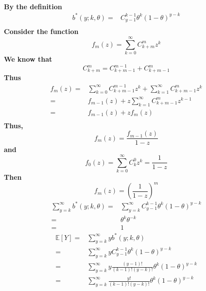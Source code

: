 \documentclass{article}
\begin{document}
    \paragraph{
        By the definition
        \begin{equation*}
            \begin{split}
                b^*(y;k,\theta)=&C_{y-1}^{k-1}\theta^k(1-\theta)^{y-k}\\
            \end{split}
        \end{equation*}
        Consider the function 
        $$f_m(z)=\sum_{k=0}^\infty C_{k+m}^m z^k$$
        We know that 
        $$C_{k+m}^m=C_{k+m-1}^{m-1}+C_{k+m-1}^m$$
        Thus
        \begin{equation*}
            \begin{split}
                f_m(z)=&\sum_{k=0}^\infty C_{k+m-1}^{m-1} z^k+\sum_{k=1}^\infty C_{k+m-1}^m z^k\\
                    =&f_{m-1}(z)+z\sum_{k=1}^\infty C_{k+m-1}^m z^{k-1}\\
                    =&f_{m-1}(z)+zf_m(z)\\
            \end{split}
        \end{equation*}
        Thus,
        $$f_m(z)=\frac{f_{m-1}(z)}{1-z}$$
        and 
        $$f_0(z)=\sum_{k=0}^\infty C_k^0z^k=\frac{1}{1-z}$$
        Then 
        $$f_m(z)=(\frac{1}{1-z})^m$$
        \begin{equation*}
            \begin{split}
                \sum_{y=k}^\infty b^*(y;k,\theta)=&\sum_{y=k}^\infty C_{y-1}^{k-1}\theta^k(1-\theta)^{y-k}\\
                    =&\theta^k\theta^{-k}\\
                    =&1
            \end{split}
        \end{equation*}
        \begin{equation*}
            \begin{split}
                \mathbb{E}[Y]=&\sum_{y=k}^\infty yb^*(y;k,\theta)\\
                    =&\sum_{y=k}^\infty y C_{y-1}^{k-1}\theta^k(1-\theta)^{y-k}\\
                    =&\sum_{y=k}^\infty y \frac{(y-1)!}{(k-1)!(y-k)!}\theta^k(1-\theta)^{y-k}\\
                    =&\sum_{y=k}^\infty \frac{y!}{(k-1)!(y-k)!}\theta^k(1-\theta)^{y-k}\\

\end{split}
\end{equation*}}
\end{document}
